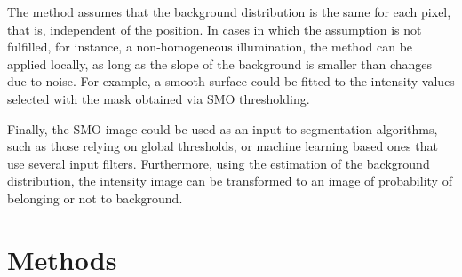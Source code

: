 \documentclass[article]{jss}
\begin{document}
	The method assumes that the background distribution is the same for each pixel, that is, independent of the position. In cases in which the assumption is not fulfilled, for instance, a non-homogeneous illumination, the method can be applied locally, as long as the slope of the background is smaller than changes due to noise. For example, a smooth surface could be fitted to the intensity values selected with the mask obtained via SMO thresholding.

	Finally, the SMO image could be used as an input to segmentation algorithms, such as those relying on global thresholds, or machine learning based ones that use several input filters. Furthermore, using the estimation of the background distribution, the intensity image can be transformed to an image of probability of belonging or not to background.

\section{Methods} \label{sec:methods}
\end{document}
